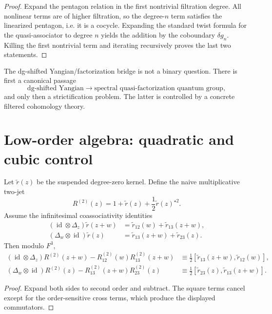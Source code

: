 \begin{proof}
Expand the pentagon relation in the first nontrivial filtration degree.
All nonlinear terms are of higher filtration, so the degree-$n$ term
satisfies the linearized pentagon, i.e. it is a cocycle. Expanding the
standard twist formula for the quasi-associator to degree $n$ yields the
addition by the coboundary $\delta g_n$. Killing the first nontrivial
term and iterating recursively proves the last two statements.
\end{proof}

\begin{conclusion}
The dg-shifted Yangian/factorization bridge is not a binary question.
There is first a canonical passage
\[
\text{dg-shifted Yangian}
\longrightarrow
\text{spectral quasi-factorization quantum group},
\]
and only then a strictification problem. The latter is controlled by a
concrete filtered cohomology theory.
\end{conclusion}

\section{Low-order algebra: quadratic and cubic control}

\begin{proposition}
\ClaimStatusProvedHere
Let $\widetilde r(z)$ be the suspended degree-zero kernel. Define the
naive multiplicative two-jet
\[
R^{(2)}(z)=1+\widetilde r(z)+\frac12\widetilde r(z)^{\star 2}.
\]
Assume the infinitesimal coassociativity identities
\begin{align*}
(\operatorname{id}\otimes \Delta_z)\widetilde r(z+w)
&=\widetilde r_{12}(w)+\widetilde r_{13}(z+w),\\
(\Delta_w\otimes \operatorname{id})\widetilde r(z)
&=\widetilde r_{13}(z+w)+\widetilde r_{23}(z).
\end{align*}
Then modulo $F^3$,
\begin{align*}
(\operatorname{id}\otimes \Delta_z)R^{(2)}(z+w)-R^{(2)}_{12}(w)R^{(2)}_{13}(z+w)
&\equiv \frac12[\widetilde r_{13}(z+w),\widetilde r_{12}(w)],\\
(\Delta_w\otimes \operatorname{id})R^{(2)}(z)-R^{(2)}_{13}(z+w)R^{(2)}_{23}(z)
&\equiv \frac12[\widetilde r_{23}(z),\widetilde r_{13}(z+w)].
\end{align*}
\end{proposition}

\begin{proof}
Expand both sides to second order and subtract. The square terms cancel
except for the order-sensitive cross terms, which produce the displayed
commutators.
\end{proof}

